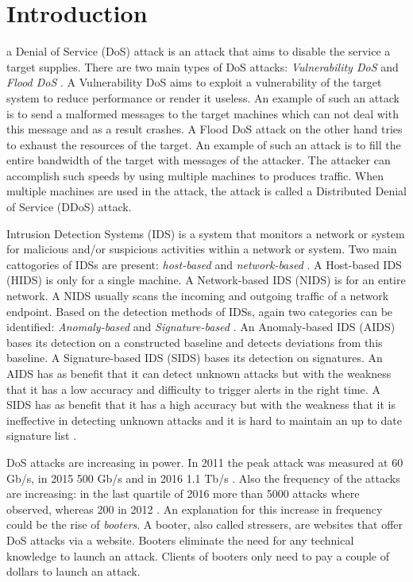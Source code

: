 \section{Introduction} \label{sec:introduction}
a Denial of Service (DoS) attack is an attack that aims to disable the service a target supplies. There are two main types of DoS attacks: \textit{Vulnerability DoS} and \textit{Flood DoS} \cite{Lin2013}. A Vulnerability DoS aims to exploit a vulnerability of the target system to reduce performance or render it useless. An example of such an attack is to send a malformed messages to the target machines which can not deal with this message and as a result crashes. A Flood DoS attack on the other hand tries to exhaust the resources of the target. An example of such an attack is to fill the entire bandwidth of the target with messages of the attacker. The attacker can accomplish such speeds by using multiple machines to produces traffic. When multiple machines are used in the attack, the attack is called a Distributed Denial of Service (DDoS) attack.  

Intrusion Detection Systems (IDS) is a system that monitors a network or system for malicious and/or suspicious activities within a network or system. Two main cattogories of IDSs are present: \textit{host-based} and \textit{network-based} \cite{Fallahi2016}. A Host-based IDS (HIDS) is only for a single machine. A Network-based IDS (NIDS) is for an entire network. A NIDS usually scans the incoming and outgoing traffic of a network endpoint. Based on the detection methods of IDSs, again two categories can be identified: \textit{Anomaly-based} and \textit{Signature-based} \cite{fragkiadakis2015anomaly}. An Anomaly-based IDS (AIDS) bases its detection on a constructed baseline and detects deviations from this baseline. A Signature-based IDS (SIDS) bases its detection on signatures. An AIDS has as benefit that it can detect unknown attacks but with the weakness that it has a low accuracy and difficulty to trigger alerts in the right time. A SIDS has as benefit that it has a high accuracy but with the weakness that it is ineffective in detecting unknown attacks and it is hard to maintain an up to date signature list \cite{Liao2013}. 

DoS attacks are increasing in power. In 2011 the peak attack was measured at 60 Gb/s, in 2015 500 Gb/s and in 2016 1.1 Tb/s \cite{Santana2017}. Also the frequency of the attacks are increasing: in the last quartile of 2016 more than 5000 attacks where observed, whereas 200 in 2012 \cite{Santana2017}. An explanation for this increase in frequency could be the rise of \textit{booters}. A booter, also called stressers, are websites that offer DoS attacks via a website. Booters eliminate the need for any technical knowledge to launch an attack. Clients of booters only need to pay a couple of dollars to launch an attack.


